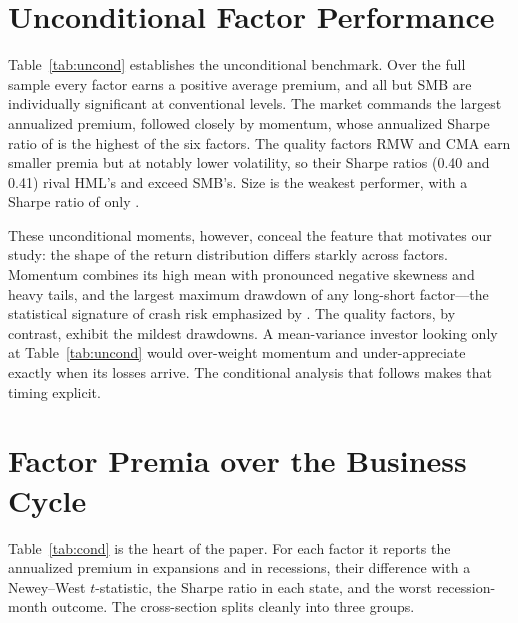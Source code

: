\documentclass[12pt]{article}
\begin{document}
\section{Unconditional Factor Performance}
\label{sec:uncond}

Table~\ref{tab:uncond} establishes the unconditional benchmark. Over the full
sample every factor earns a positive average premium, and all but SMB are
individually significant at conventional levels. The market commands the largest
annualized premium, followed closely by momentum, whose annualized Sharpe ratio
of \momSharpe{} is the highest of the six factors. The quality factors RMW and
CMA earn smaller premia but at notably lower volatility, so their Sharpe ratios
(0.40 and 0.41) rival HML's and exceed SMB's. Size is the weakest performer,
with a Sharpe ratio of only \smbSharpe.

These unconditional moments, however, conceal the feature that motivates our
study: the shape of the return distribution differs starkly across factors.
Momentum combines its high mean with pronounced negative skewness and heavy
tails, and the largest maximum drawdown of any long-short factor---the
statistical signature of crash risk emphasized by \citet{daniel2016momentum}.
The quality factors, by contrast, exhibit the mildest drawdowns. A mean-variance
investor looking only at Table~\ref{tab:uncond} would over-weight momentum and
under-appreciate exactly when its losses arrive. The conditional analysis that
follows makes that timing explicit.

\begin{table}[t]
\centering
\caption{\textbf{Unconditional factor performance, \sampStart--\sampEnd.}
Monthly and annualized mean premia (\%), annualized volatility (\%), annualized
Sharpe ratio, the Newey--West $t$-statistic for the mean, skewness, excess
kurtosis, maximum drawdown (\%), and the share of months with positive returns.}
\label{tab:uncond}
\small

\end{table}

\section{Factor Premia over the Business Cycle}
\label{sec:cond}

Table~\ref{tab:cond} is the heart of the paper. For each factor it reports the
annualized premium in expansions and in recessions, their difference with a
Newey--West $t$-statistic, the Sharpe ratio in each state, and the worst
recession-month outcome. The cross-section splits cleanly into three groups.
\end{document}
